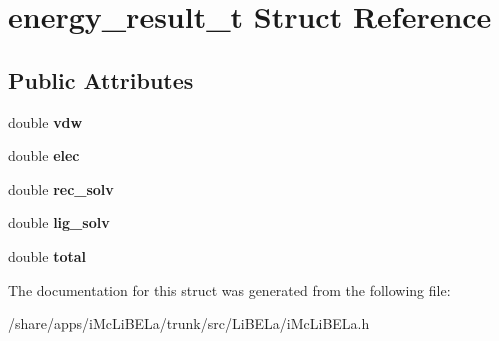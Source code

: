 \hypertarget{structenergy__result__t}{
\section{energy\_\-result\_\-t Struct Reference}
\label{structenergy__result__t}
}
\subsection*{Public Attributes}
\begin{DoxyCompactItemize}
\item 
\hypertarget{structenergy__result__t_a199f7ff74fcfdd0cc720aec645098c8f}{
double {\bfseries vdw}}
\label{structenergy__result__t_a199f7ff74fcfdd0cc720aec645098c8f}

\item 
\hypertarget{structenergy__result__t_a5526fdefeee66c50a99dcec18affd565}{
double {\bfseries elec}}
\label{structenergy__result__t_a5526fdefeee66c50a99dcec18affd565}

\item 
\hypertarget{structenergy__result__t_a412ff8df4882f23683dd065b502f8799}{
double {\bfseries rec\_\-solv}}
\label{structenergy__result__t_a412ff8df4882f23683dd065b502f8799}

\item 
\hypertarget{structenergy__result__t_aec6e043131c1e06a6a05a8510b2ee6d7}{
double {\bfseries lig\_\-solv}}
\label{structenergy__result__t_aec6e043131c1e06a6a05a8510b2ee6d7}

\item 
\hypertarget{structenergy__result__t_af067fe78d4d852ca8ce29c106a777247}{
double {\bfseries total}}
\label{structenergy__result__t_af067fe78d4d852ca8ce29c106a777247}

\end{DoxyCompactItemize}


The documentation for this struct was generated from the following file:\begin{DoxyCompactItemize}
\item 
/share/apps/iMcLiBELa/trunk/src/LiBELa/iMcLiBELa.h\end{DoxyCompactItemize}
